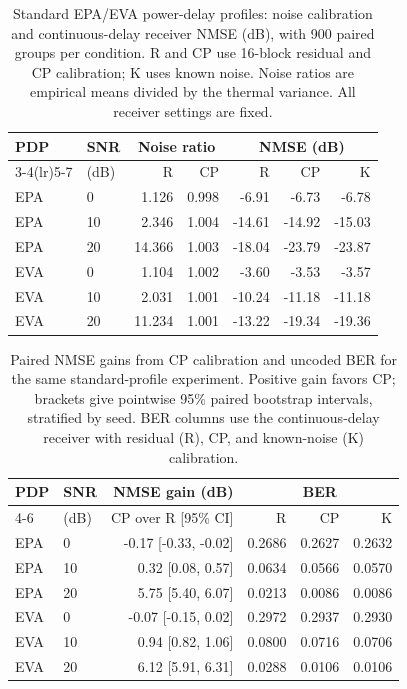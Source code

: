 \begin{table}[t]
\centering
\caption{Standard EPA/EVA power-delay profiles: noise calibration and continuous-delay receiver NMSE (dB), with 900 paired groups per condition. R and CP use 16-block residual and CP calibration; K uses known noise. Noise ratios are empirical means divided by the thermal variance. All receiver settings are fixed.}
\label{tab:standard_nmse}
\small
\setlength{\tabcolsep}{5pt}
\begin{tabular}{llrrrrr}
\toprule
PDP & SNR & \multicolumn{2}{c}{Noise ratio} & \multicolumn{3}{c}{NMSE (dB)} \\
\cmidrule(lr){3-4}\cmidrule(lr){5-7}
 & (dB) & R & CP & R & CP & K \\
\midrule
EPA & 0 & 1.126 & 0.998 & -6.91 & -6.73 & -6.78 \\
EPA & 10 & 2.346 & 1.004 & -14.61 & -14.92 & -15.03 \\
EPA & 20 & 14.366 & 1.003 & -18.04 & -23.79 & -23.87 \\
\midrule
EVA & 0 & 1.104 & 1.002 & -3.60 & -3.53 & -3.57 \\
EVA & 10 & 2.031 & 1.001 & -10.24 & -11.18 & -11.18 \\
EVA & 20 & 11.234 & 1.001 & -13.22 & -19.34 & -19.36 \\
\bottomrule
\end{tabular}
\end{table}

\begin{table}[t]
\centering
\caption{Paired NMSE gains from CP calibration and uncoded BER for the same standard-profile experiment. Positive gain favors CP; brackets give pointwise 95\% paired bootstrap intervals, stratified by seed. BER columns use the continuous-delay receiver with residual (R), CP, and known-noise (K) calibration.}
\label{tab:standard_gain}
\small
\setlength{\tabcolsep}{5pt}
\begin{tabular}{llrrrr}
\toprule
PDP & SNR & NMSE gain (dB) & \multicolumn{3}{c}{BER} \\
\cmidrule(lr){4-6}
 & (dB) & CP over R [95\% CI] & R & CP & K \\
\midrule
EPA & 0 & -0.17 [-0.33, -0.02] & 0.2686 & 0.2627 & 0.2632 \\
EPA & 10 & 0.32 [0.08, 0.57] & 0.0634 & 0.0566 & 0.0570 \\
EPA & 20 & 5.75 [5.40, 6.07] & 0.0213 & 0.0086 & 0.0086 \\
\midrule
EVA & 0 & -0.07 [-0.15, 0.02] & 0.2972 & 0.2937 & 0.2930 \\
EVA & 10 & 0.94 [0.82, 1.06] & 0.0800 & 0.0716 & 0.0706 \\
EVA & 20 & 6.12 [5.91, 6.31] & 0.0288 & 0.0106 & 0.0106 \\
\bottomrule
\end{tabular}
\end{table}
